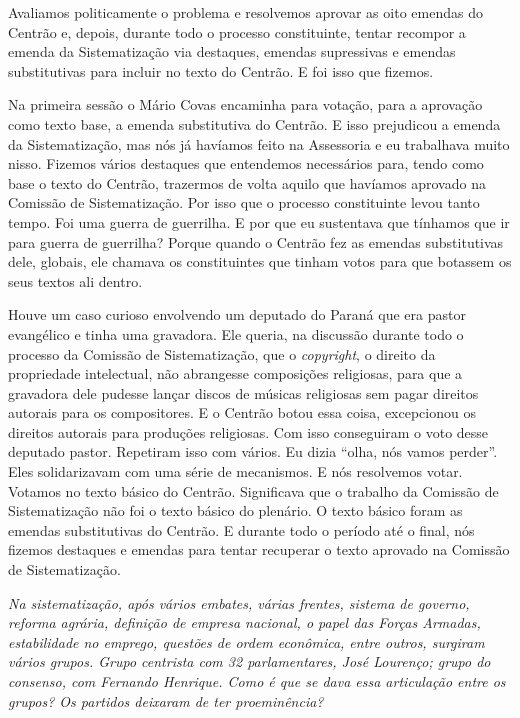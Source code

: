 Avaliamos politicamente o problema e resolvemos aprovar as oito emendas
do Centrão e, depois, durante todo o processo constituinte, tentar
recompor a emenda da Sistematização via destaques, emendas supressivas e
emendas substitutivas para incluir no texto do Centrão. E foi isso que
fizemos.

Na primeira sessão o Mário Covas encaminha para votação, para a
aprovação como texto base, a emenda substitutiva do Centrão. E isso
prejudicou a emenda da Sistematização, mas nós já havíamos feito na
Assessoria e eu trabalhava muito nisso. Fizemos vários destaques que
entendemos necessários para, tendo como base o texto do Centrão,
trazermos de volta aquilo que havíamos aprovado na Comissão de
Sistematização. Por isso que o processo constituinte levou tanto tempo.
Foi uma guerra de guerrilha. E por que eu sustentava que tínhamos que ir
para guerra de guerrilha? Porque quando o Centrão fez as emendas
substitutivas dele, globais, ele chamava os constituintes que tinham
votos para que botassem os seus textos ali dentro.

Houve um caso curioso envolvendo um deputado do Paraná que era pastor
evangélico e tinha uma gravadora. Ele queria, na discussão durante todo
o processo da Comissão de Sistematização, que o \emph{copyright}, o direito
da propriedade intelectual, não abrangesse composições religiosas, para
que a gravadora dele pudesse lançar discos de músicas religiosas sem
pagar direitos autorais para os compositores. E o Centrão botou essa
coisa, excepcionou os direitos autorais para produções religiosas. Com
isso conseguiram o voto desse deputado pastor. Repetiram isso com
vários. Eu dizia ``olha, nós vamos perder''. Eles solidarizavam com uma
série de mecanismos. E nós resolvemos votar. Votamos no texto básico do
Centrão. Significava que o trabalho da Comissão de Sistematização não
foi o texto básico do plenário. O texto básico foram as emendas
substitutivas do Centrão. E durante todo o período até o final, nós
fizemos destaques e emendas para tentar recuperar o texto aprovado na
Comissão de Sistematização.

\medskip

\noindent\emph{Na sistematização, após vários embates, várias frentes, sistema
de governo, reforma agrária, definição de empresa nacional, o papel das
Forças Armadas, estabilidade no emprego, questões de ordem econômica,
entre outros, surgiram vários grupos. Grupo centrista com 32
parlamentares, José Lourenço; grupo do consenso, com Fernando Henrique.
Como é que se dava essa articulação entre os grupos? Os partidos
deixaram de ter proeminência?}

